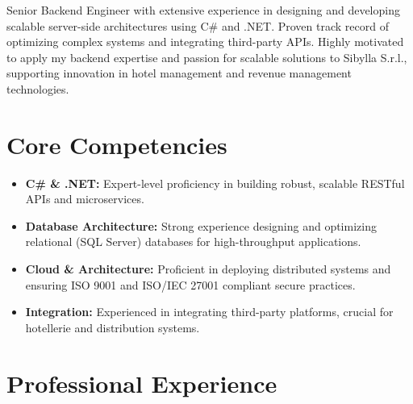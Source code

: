 \documentclass[11pt,a4paper,sans]{moderncv}
\begin{document}
\makecvtitle

\vspace{-15pt}
Senior Backend Engineer with extensive experience in designing and developing scalable server-side architectures using C\# and .NET. Proven track record of optimizing complex systems and integrating third-party APIs. Highly motivated to apply my backend expertise and passion for scalable solutions to Sibylla S.r.l., supporting innovation in hotel management and revenue management technologies.

\section{Core Competencies}
\vspace{1pt}
\begin{itemize}
\item \textbf{C\# \& .NET:} Expert-level proficiency in building robust, scalable RESTful APIs and microservices.
\item \textbf{Database Architecture:} Strong experience designing and optimizing relational (SQL Server) databases for high-throughput applications.
\item \textbf{Cloud \& Architecture:} Proficient in deploying distributed systems and ensuring ISO 9001 and ISO/IEC 27001 compliant secure practices.
\item \textbf{Integration:} Experienced in integrating third-party platforms, crucial for hotellerie and distribution systems.
\end{itemize}

\section{Professional Experience}
\vspace{1pt}

\vspace{3pt}
\end{document}

